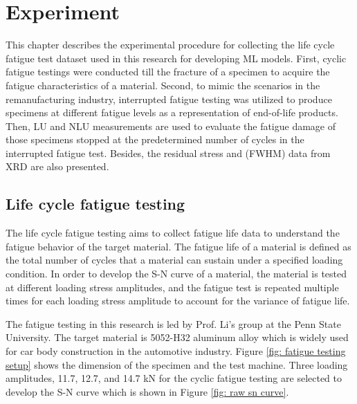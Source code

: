 \chapter{Experiment}
\label{chap: exper}
This chapter describes the experimental procedure for collecting the life cycle fatigue test dataset used in this research for developing ML models. First, cyclic fatigue testings were conducted till the fracture of a specimen to acquire the fatigue characteristics of a material. Second, to mimic the scenarios in the remanufacturing industry, interrupted fatigue testing was utilized to produce specimens at different fatigue levels as a representation of end-of-life products. Then, LU and NLU measurements are used to evaluate the fatigue damage of those specimens stopped at the predetermined number of cycles in the interrupted fatigue test. Besides, the residual stress and (FWHM) data from XRD are also presented.

\section{Life cycle fatigue testing}
The life cycle fatigue testing aims to collect fatigue life data to understand the fatigue behavior of the target material. The fatigue life of a material is defined as the total number of cycles that a material can sustain under a specified loading condition. In order to develop the S-N curve of a material, the material is tested at different loading stress amplitudes, and the fatigue test is repeated multiple times for each loading stress amplitude to account for the variance of fatigue life.

The fatigue testing in this research is led by Prof. Li's group at the Penn State University. The target material is 5052-H32 aluminum alloy which is widely used for car body construction in the automotive industry. Figure \ref{fig: fatigue testing setup} shows the dimension of the specimen and the test machine. Three loading amplitudes, 11.7, 12.7, and 14.7 kN for the cyclic fatigue testing are selected to develop the S-N curve which is shown in Figure \ref{fig: raw sn curve}. 

